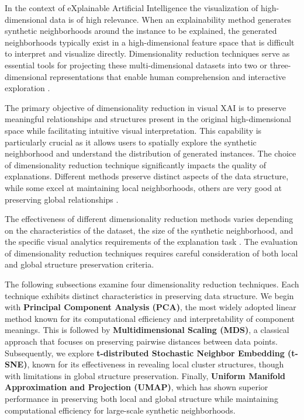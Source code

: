 In the context of eXplainable Artificial Intelligence
the visualization of high-dimensional data is of high relevance. When 
an explainability method
generates synthetic neighborhoods around the instance to be explained, the generated neighborhoods typically exist in a high-dimensional feature space that is difficult to interpret and visualize directly. Dimensionality reduction techniques serve as essential tools for projecting these multi-dimensional datasets into two or three-dimensional representations that enable human comprehension and interactive exploration \cite{yang2021dimensionality}.

The primary objective of dimensionality reduction in visual XAI is to preserve meaningful relationships and structures present in the original high-dimensional space while facilitating intuitive visual interpretation. 
This capability is particularly crucial as it allows users to spatially explore the synthetic neighborhood and understand the distribution of generated instances. The choice of dimensionality reduction technique significantly impacts the quality of explanations. Different methods preserve distinct aspects of the data structure, while some excel at maintaining local neighborhoods, others are very good at preserving global relationships \cite{becht2019evaluation}.

The effectiveness of different dimensionality reduction methods varies depending on the characteristics of the dataset, the size of the synthetic neighborhood, and the specific visual analytics requirements of the explanation task \cite{wang2021understanding}. The evaluation of dimensionality reduction techniques requires careful consideration of both local and global structure preservation criteria.

The following subsections examine four dimensionality reduction techniques. Each technique exhibits distinct characteristics in preserving data structure. We begin with \textbf{Principal Component Analysis (PCA)}, the most widely adopted linear method known for its computational efficiency and interpretability of component meanings. This is followed by \textbf{Multidimensional Scaling (MDS)}, a classical approach that focuses on preserving pairwise distances between data points. Subsequently, we explore \textbf{t-distributed Stochastic Neighbor Embedding (t-SNE)}, known for its effectiveness in revealing local cluster structures, though with limitations in global structure preservation. Finally, \textbf{Uniform Manifold Approximation and Projection (UMAP)}, which has shown superior performance in preserving both local and global structure while maintaining computational efficiency for large-scale synthetic neighborhoods.

